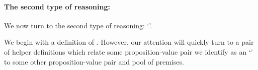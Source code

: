 \begin{note}
\end{note}


\paragraph*{The second type of reasoning: \adB{}}

\begin{note}
  We now turn to the second type of reasoning: `\adB{}'.

  We begin with a definition of \adB{}.
  However, our attention will quickly turn to a pair of helper definitions which relate some proposition-value pair we identify as an `\itp{}' to some other proposition-value pair and pool of premises.
\end{note}

